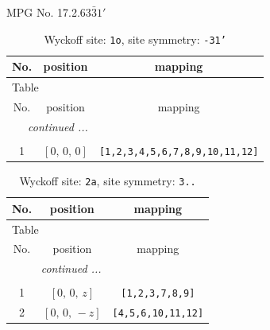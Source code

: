 \documentclass[fleqn,8pt]{jsarticle}
\begin{document}
\setcounter{MaxMatrixCols}{32}

\renewcommand{\tablename}{Table~}
\renewcommand{\figurename}{Figure~}
\begin{center}
\LARGE
MPG No. 17.2.63\quad$\bar{3}1'$
\end{center}
\renewcommand{\arraystretch}{1.2}
\begin{longtable}{ccc}
\caption{Wyckoff site: {\tt 1o}, site symmetry: {\tt -31'}}
 \\
 \hline \hline
No. & position & mapping \\ \hline \endfirsthead

\multicolumn{2}{l}{\tablename\ \thetable{}} \\
 \hline \hline
No. & position & mapping \\ \hline \endhead

 \hline \hline
\multicolumn{2}{r}{\footnotesize\it continued ...} \\ \endfoot

 \hline \hline
\multicolumn{2}{r}{} \\ \endlastfoot

1 & $\left[ 0,\, 0,\, 0 \right]$ & {\tt [1,2,3,4,5,6,7,8,9,10,11,12]} \\
\end{longtable}
\renewcommand{\arraystretch}{1.2}
\begin{longtable}{ccc}
\caption{Wyckoff site: {\tt 2a}, site symmetry: {\tt 3..}}
 \\
 \hline \hline
No. & position & mapping \\ \hline \endfirsthead

\multicolumn{2}{l}{\tablename\ \thetable{}} \\
 \hline \hline
No. & position & mapping \\ \hline \endhead

 \hline \hline
\multicolumn{2}{r}{\footnotesize\it continued ...} \\ \endfoot

 \hline \hline
\multicolumn{2}{r}{} \\ \endlastfoot

1 & $\left[ 0,\, 0,\, z \right]$ & {\tt [1,2,3,7,8,9]} \\ \hline
2 & $\left[ 0,\, 0,\, - z \right]$ & {\tt [4,5,6,10,11,12]} \\
\end{longtable}
\renewcommand{\arraystretch}{1.2}
\end{document}
